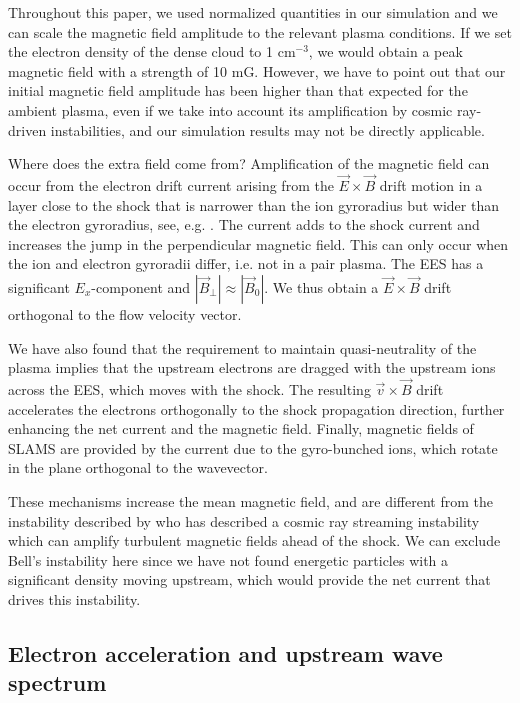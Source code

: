 \documentclass[structabstract]{aa}
\begin{document}
Throughout this paper, we used normalized quantities in our simulation and 
we can scale the magnetic field amplitude to the relevant plasma conditions. 
If we set the electron density of the dense cloud to 1 cm$^{-3}$, we would 
obtain a peak magnetic field with a strength of 10 mG. However, we have
to point out that our initial magnetic field amplitude has been higher than 
that expected for the ambient plasma, even if we take into account its
amplification by cosmic ray-driven instabilities, and our simulation results
may not be directly applicable.

Where does the extra field come from? Amplification of the magnetic field 
can occur from the electron drift current arising from the $\vec{E} \times 
\vec{B}$ drift motion in a layer close to the shock that is narrower than 
the ion gyroradius but wider than the electron gyroradius, see, e.g. 
\citet{BaumjohannTreumann}. The current adds to the shock current and 
increases the jump in the perpendicular magnetic field. This can only 
occur when the ion and electron gyroradii differ, i.e. not in a pair plasma. 
The EES has a significant $E_x$-component and $|\vec{B}_\perp| \approx 
|\vec{B}_0|$. We thus obtain a $\vec{E}\times \vec{B}$ drift orthogonal to 
the flow velocity vector.

We have also found that the requirement to maintain quasi-neutrality of the
plasma implies that the upstream electrons are dragged with the upstream
ions across the EES, which moves with the shock. The resulting 
$\vec{v}\times\vec{B}$ drift accelerates the electrons orthogonally to
the shock propagation direction, further enhancing the net current and
the magnetic field. Finally, magnetic fields of SLAMS are provided by the 
current due to the gyro-bunched ions, which rotate in the plane orthogonal 
to the wavevector.

These mechanisms increase the mean magnetic field, and are different from 
the instability described by \citet{MagAmp3} who has described a cosmic ray 
streaming instability which can amplify turbulent magnetic fields ahead of 
the shock. We can exclude Bell's instability here since we have not found 
energetic particles with a significant density moving upstream, which would 
provide the net current that drives this instability.

\subsection{Electron acceleration and upstream wave spectrum}
\end{document}
